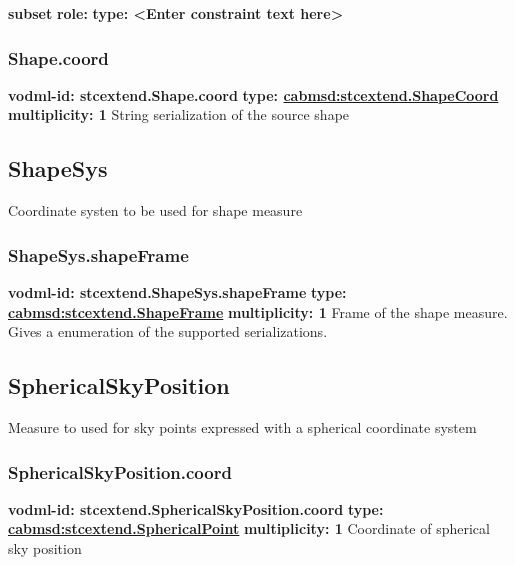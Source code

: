     \noindent \textbf{subset} \newline
    \indent   \textbf{role: } \newline
    \indent   \textbf{type: <Enter constraint text here>} \newline


    \subsubsection{Shape.coord}
      \textbf{vodml-id: stcextend.Shape.coord} \newline
      \textbf{type: \hyperref[sect:stcextend.ShapeCoord]{cabmsd:stcextend.ShapeCoord}} \newline
      \textbf{multiplicity: 1} \newline 
      String serialization of the source shape

  \subsection{ShapeSys}
  \label{sect:stcextend.ShapeSys}
    Coordinate systen to be used for shape measure

    \subsubsection{ShapeSys.shapeFrame}
      \textbf{vodml-id: stcextend.ShapeSys.shapeFrame} \newline
      \textbf{type: \hyperref[sect:stcextend.ShapeFrame]{cabmsd:stcextend.ShapeFrame}} \newline
      \textbf{multiplicity: 1} \newline 
      Frame of the shape measure. Gives a enumeration of the supported serializations.

  \subsection{SphericalSkyPosition}
  \label{sect:stcextend.SphericalSkyPosition}
    Measure to used for sky points expressed with a spherical coordinate system

    \subsubsection{SphericalSkyPosition.coord}
      \textbf{vodml-id: stcextend.SphericalSkyPosition.coord} \newline
      \textbf{type: \hyperref[sect:stcextend.SphericalPoint]{cabmsd:stcextend.SphericalPoint}} \newline
      \textbf{multiplicity: 1} \newline 
      Coordinate of spherical sky position


